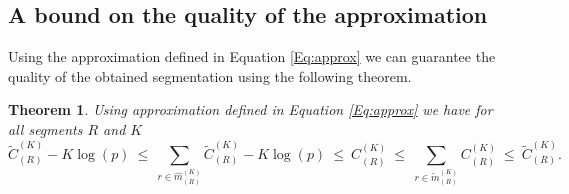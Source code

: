 \documentclass[11pt]{llncs}
\newtheorem{theo}{Theorem}[section]    %
\begin{document}
\subsection{A bound on the quality of the approximation }
Using the approximation defined in Equation \ref{Eq:approx} we can guarantee the quality of the obtained segmentation using the following theorem.
\begin{theo}
Using approximation defined in Equation \ref{Eq:approx} we have for all segments $R$ and $K$
$$\widetilde{C}_{(R)}^{(K)} - K \log(p) 
\ \leq \ 
\underset{r \in \widehat{m}_{(R)}^{(K)}}{\operatorname{\sum}} \widetilde{C}_{(R)}^{(K)} - K \log(p) 
\ \leq \ 
{C}_{(R)}^{(K)} 
\ \leq \ 
\underset{r \in \widetilde{m}_{(R)}^{(K)}}{\operatorname{\sum}} {C}_{(R)}^{(K)} 
\ \leq \ 
\widetilde{C}_{(R)}^{(K)}.$$
\label{theo:theoapprox}
\end{theo}
\vspace{-1cm}
\end{document}
